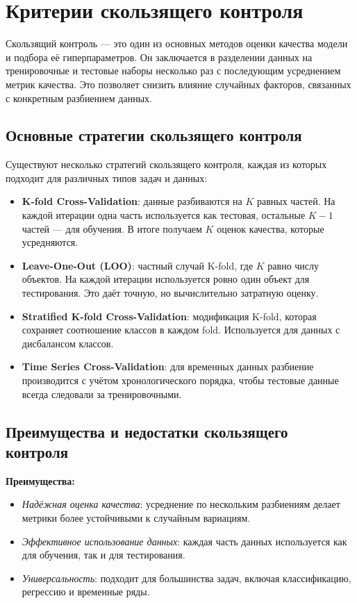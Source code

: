 \section*{Критерии скользящего контроля}
Скользящий контроль — это один из основных методов оценки качества модели и подбора её гиперпараметров. Он заключается в разделении данных на тренировочные и тестовые наборы несколько раз с последующим усреднением метрик качества. Это позволяет снизить влияние случайных факторов, связанных с конкретным разбиением данных.

\subsection*{Основные стратегии скользящего контроля}
Существуют несколько стратегий скользящего контроля, каждая из которых подходит для различных типов задач и данных:
\begin{itemize}
    \item \textbf{K-fold Cross-Validation}: данные разбиваются на $K$ равных частей. На каждой итерации одна часть используется как тестовая, остальные $K-1$ частей — для обучения. В итоге получаем $K$ оценок качества, которые усредняются.
    \item \textbf{Leave-One-Out (LOO)}: частный случай K-fold, где $K$ равно числу объектов. На каждой итерации используется ровно один объект для тестирования. Это даёт точную, но вычислительно затратную оценку.
    \item \textbf{Stratified K-fold Cross-Validation}: модификация K-fold, которая сохраняет соотношение классов в каждом fold. Используется для данных с дисбалансом классов.
    \item \textbf{Time Series Cross-Validation}: для временных данных разбиение производится с учётом хронологического порядка, чтобы тестовые данные всегда следовали за тренировочными.
\end{itemize}

\subsection*{Преимущества и недостатки скользящего контроля}
\textbf{Преимущества:}
\begin{itemize}
    \item \textit{Надёжная оценка качества}: усреднение по нескольким разбиениям делает метрики более устойчивыми к случайным вариациям.
    \item \textit{Эффективное использование данных}: каждая часть данных используется как для обучения, так и для тестирования.
    \item \textit{Универсальность}: подходит для большинства задач, включая классификацию, регрессию и временные ряды.
\end{itemize}

